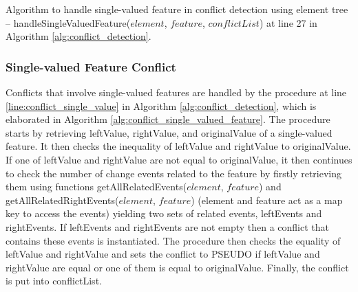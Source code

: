 \IncMargin{1.5em}
\begin{algorithm*}[]
  \begin{scriptsize}
  \end{scriptsize}
  \caption{Algorithm to handle single-valued feature in conflict detection using element tree -- handleSingleValuedFeature($element$, $feature$, $conflictList$) at line 27 in Algorithm \ref{alg:conflict_detection}.}
  \label{alg:conflict_single_valued_feature}
\end{algorithm*}
\DecMargin{1.5em}

\subsubsection{Single-valued Feature Conflict} 
\label{sec:single_valued_conflict}
Conflicts that involve single-valued features are handled by the procedure at line \ref{line:conflict_single_value} in Algorithm \ref{alg:conflict_detection}, which is elaborated in Algorithm \ref{alg:conflict_single_valued_feature}. The procedure starts by retrieving \textsf{leftValue}, \textsf{rightValue}, and \textsf{originalValue} of a single-valued feature. It then checks the inequality of \textsf{leftValue} and \textsf{rightValue} to \textsf{originalValue}. If one of \textsf{leftValue} and \textsf{rightValue} are not equal to \textsf{originalValue}, it then continues to check the number of change events related to the feature by firstly retrieving them using functions \textsf{getAllRelatedEvents($element$, $feature$)} and \textsf{getAllRelatedRightEvents($element$, $feature$)} (element and feature act as a map key to access the events) yielding two sets of related events, \textsf{leftEvents} and \textsf{rightEvents}. If \textsf{leftEvents} and \textsf{rightEvents} are not empty then a conflict that contains these events is instantiated. The procedure then checks the equality of \textsf{leftValue} and \textsf{rightValue} and sets the conflict to \textsf{PSEUDO} if \textsf{leftValue} and \textsf{rightValue} are equal or one of them is equal to \textsf{originalValue}. Finally, the conflict is put into \textsf{conflictList}. 

